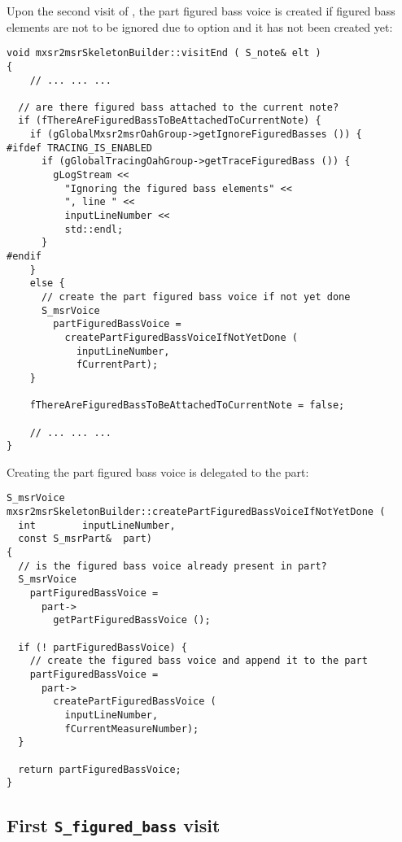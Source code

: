 Upon the second visit of , the part figured bass voice is created if figured bass elements are not to be ignored due to option  and it has not been created yet:
\begin{lstlisting}[language=CPlusPlus]
void mxsr2msrSkeletonBuilder::visitEnd ( S_note& elt )
{
	// ... ... ...

  // are there figured bass attached to the current note?
  if (fThereAreFiguredBassToBeAttachedToCurrentNote) {
    if (gGlobalMxsr2msrOahGroup->getIgnoreFiguredBasses ()) {
#ifdef TRACING_IS_ENABLED
      if (gGlobalTracingOahGroup->getTraceFiguredBass ()) {
        gLogStream <<
          "Ignoring the figured bass elements" <<
          ", line " <<
          inputLineNumber <<
          std::endl;
      }
#endif
    }
    else {
      // create the part figured bass voice if not yet done
      S_msrVoice
        partFiguredBassVoice =
          createPartFiguredBassVoiceIfNotYetDone (
            inputLineNumber,
            fCurrentPart);
    }

    fThereAreFiguredBassToBeAttachedToCurrentNote = false;

	// ... ... ...
}
\end{lstlisting}

Creating the part figured bass voice is delegated to the part:
\begin{lstlisting}[language=CPlusPlus]
S_msrVoice mxsr2msrSkeletonBuilder::createPartFiguredBassVoiceIfNotYetDone (
  int        inputLineNumber,
  const S_msrPart&  part)
{
  // is the figured bass voice already present in part?
  S_msrVoice
    partFiguredBassVoice =
      part->
        getPartFiguredBassVoice ();

  if (! partFiguredBassVoice) {
    // create the figured bass voice and append it to the part
    partFiguredBassVoice =
      part->
        createPartFiguredBassVoice (
          inputLineNumber,
          fCurrentMeasureNumber);
  }

  return partFiguredBassVoice;
}
\end{lstlisting}


\subsection{First {\tt S_figured_bass} visit}

